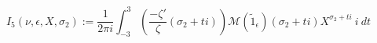 \begin{definition}[I₅]
\label{I5}
\leanok
$$
  I_5(\nu, \epsilon, X, \sigma_2) := \frac{1}{2\pi i} \int_{-3}^{3}
  \left(
  \frac{-\zeta'}\zeta(\sigma_2 + t i)
  \right)
    \mathcal M(\widetilde 1_\epsilon)(\sigma_2 + t i)
  X^{\sigma_2 + t i} \ i \ dt
  $$
\end{definition}
